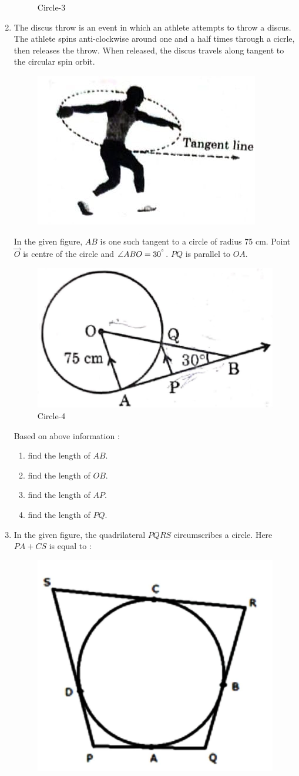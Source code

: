 \documentclass{article}
\begin{document}
\begin{enumerate}
\begin{figure}[h!]
			\caption{Circle-3}
			\label{fig:circle}
		\end{figure}
	\item The discus throw is an event in which an athlete attempts to throw a discus. The athlete spins anti-clockwise around one and a half times through a cicrle, then releases the throw. When released, the discus travels along tangent to the circular spin orbit.
		\begin{figure}[H]
			\centering
			\includegraphics[width=0.3\columnwidth]{fig4.jpg}
		\end{figure}
		In the given figure, $ AB $ is one such tangent to a circle of radius 75 cm. Point $ \vec{O} $ is centre of the circle and $ \angle{ABO} = 30^{\degree} $. $ PQ $ is parallel to $ OA $.
		\begin{figure}[H]
			\centering
			\includegraphics[width=0.4\columnwidth]{fig5.jpg}
			\caption{Circle-4}
			\label{fig:circle}
		\end{figure}
		Based on above information :
		\begin{enumerate}
			\item find the length of $ AB $.
			\item find the length of $ OB $.
			\item find the length of $ AP $.
			\item find the length of $ PQ $.
		\end{enumerate}
	\item In the given figure, the quadrilateral $ PQRS $ circumscribes a circle. Here $ PA + CS $ is equal to :
		\begin{figure}[h!]
			\centering
			\includegraphics[width=0.35\columnwidth]{fig6.jpg}

\end{figure}
\end{enumerate}
\end{document}
